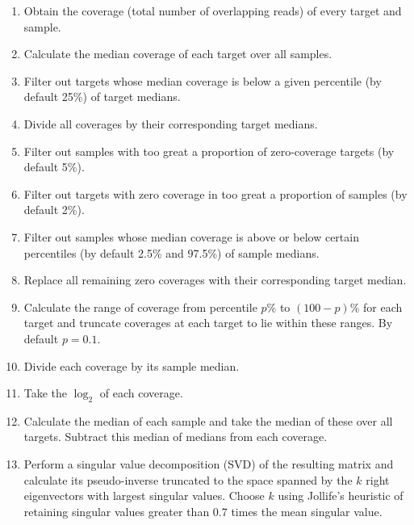 \documentclass[nofootinbib,amssymb,amsmath]{revtex4}
\begin{document}
\begin{enumerate}

\item  Obtain the coverage (total number of overlapping reads) of every target and sample.

\item Calculate the median coverage of each target over all samples.

\item  Filter out targets whose median coverage is below a given percentile (by default 25\%) of target medians.

\item  Divide all coverages by their corresponding target medians.

\item Filter out samples with too great a proportion of zero-coverage targets (by default 5\%).

\item Filter out targets with zero coverage in too great a proportion of samples (by default 2\%).

\item Filter out samples whose median coverage is above or below certain percentiles (by default 2.5\% and 97.5\%) of sample medians.

\item Replace all remaining zero coverages with their corresponding target median. 

\item Calculate the range of coverage from percentile $p$\% to $(100 - p)$\% for each target and truncate coverages at each target to lie within these ranges.  By default $p = 0.1$.

\item Divide each coverage by its sample median.

\item Take the $\log_2$ of each coverage.

\item Calculate the median of each sample and take the median of these over all targets.  Subtract this median of medians from each coverage.

\item Perform a singular value decomposition (SVD) of the resulting matrix and calculate its pseudo-inverse truncated to the space spanned by the $k$ right eigenvectors with largest singular values. Choose $k$ using Jollife's heuristic of retaining singular values greater than 0.7 times the mean singular value.

\end{enumerate}
\end{document}
